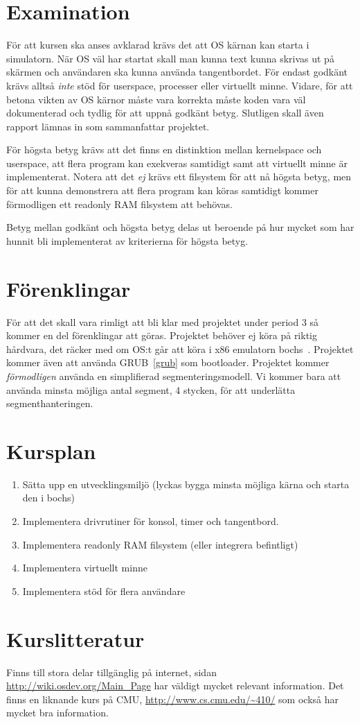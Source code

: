 \documentclass[11pt,oneside,a4paper]{article}
\begin{document}
\section{Examination}
För att kursen ska anses avklarad krävs det att OS kärnan kan starta i
simulatorn. När OS väl har startat skall man kunna text kunna skrivas ut på
skärmen och användaren ska kunna använda tangentbordet. För endast godkänt
krävs alltså \emph{inte} stöd för userspace, processer eller virtuellt minne.
Vidare, för att betona vikten av OS kärnor måste vara korrekta måste koden vara
väl dokumenterad och tydlig för att uppnå godkänt betyg.
Slutligen skall även rapport lämnas in som sammanfattar projektet.

För högsta betyg krävs att det finns en distinktion mellan kernelspace och
userspace, att flera program kan exekveras samtidigt samt att virtuellt minne är
implementerat. Notera att det \emph{ej} krävs ett filsystem för att nå högsta
betyg, men för att kunna demonstrera att flera program kan köras samtidigt
kommer förmodligen ett readonly RAM filsystem att behövas.

Betyg mellan godkänt och högsta betyg delas ut beroende på hur mycket som har
hunnit bli implementerat av kriterierna för högsta betyg.

\section{Förenklingar}
För att det skall vara rimligt att bli klar med projektet under period 3 så
kommer en del förenklingar att göras.
Projektet behöver ej köra på riktig hårdvara, det räcker med om OS:t går att
köra i x86 emulatorn bochs~\cite{bochs}. Projektet kommer även att använda
GRUB~\ref{grub} som bootloader. Projektet kommer \emph{förmodligen} använda en
simplifierad segmenteringsmodell. Vi kommer bara att använda minsta möjliga
antal segment, 4 stycken, för att underlätta segmenthanteringen.

\section{Kursplan}
\begin{enumerate}
    \item Sätta upp en utvecklingsmiljö (lyckas bygga minsta möjliga kärna och
    starta den i bochs)
    \item Implementera drivrutiner för konsol, timer och tangentbord.
    \item Implementera readonly RAM filsystem (eller integrera befintligt)
    \item Implementera virtuellt minne
    \item Implementera stöd för flera användare
\end{enumerate}

\section{Kurslitteratur}
Finns till stora delar tillgänglig på internet, sidan
\url{http://wiki.osdev.org/Main_Page} har väldigt mycket relevant information.
Det finns en liknande kurs på CMU, \url{http://www.cs.cmu.edu/~410/} som också
har mycket bra information.
\end{document}
